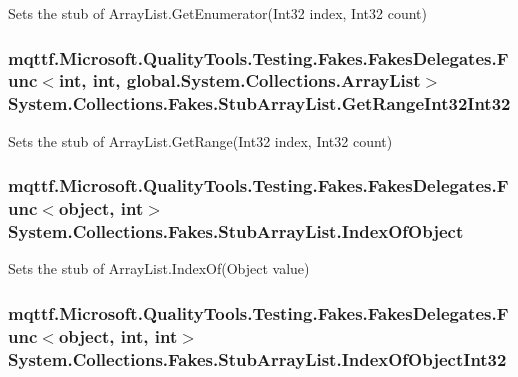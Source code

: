 Sets the stub of Array\-List.\-Get\-Enumerator(\-Int32 index, Int32 count)

\hypertarget{class_system_1_1_collections_1_1_fakes_1_1_stub_array_list_ac4ced8b31a1aa51750cb83e154f4c251}{
\subsubsection[{Get\-Range\-Int32\-Int32}]{\setlength{\rightskip}{0pt plus 5cm}mqttf.\-Microsoft.\-Quality\-Tools.\-Testing.\-Fakes.\-Fakes\-Delegates.\-Func$<$int, int, global.\-System.\-Collections.\-Array\-List$>$ System.\-Collections.\-Fakes.\-Stub\-Array\-List.\-Get\-Range\-Int32\-Int32}}\label{class_system_1_1_collections_1_1_fakes_1_1_stub_array_list_ac4ced8b31a1aa51750cb83e154f4c251}


Sets the stub of Array\-List.\-Get\-Range(\-Int32 index, Int32 count)

\hypertarget{class_system_1_1_collections_1_1_fakes_1_1_stub_array_list_a5ef9b0801f77e0e0ba7886a66dfc3974}{
\subsubsection[{Index\-Of\-Object}]{\setlength{\rightskip}{0pt plus 5cm}mqttf.\-Microsoft.\-Quality\-Tools.\-Testing.\-Fakes.\-Fakes\-Delegates.\-Func$<$object, int$>$ System.\-Collections.\-Fakes.\-Stub\-Array\-List.\-Index\-Of\-Object}}\label{class_system_1_1_collections_1_1_fakes_1_1_stub_array_list_a5ef9b0801f77e0e0ba7886a66dfc3974}


Sets the stub of Array\-List.\-Index\-Of(\-Object value)

\hypertarget{class_system_1_1_collections_1_1_fakes_1_1_stub_array_list_aff4e3edbc43a2e425eef9251effa1fe3}{
\subsubsection[{Index\-Of\-Object\-Int32}]{\setlength{\rightskip}{0pt plus 5cm}mqttf.\-Microsoft.\-Quality\-Tools.\-Testing.\-Fakes.\-Fakes\-Delegates.\-Func$<$object, int, int$>$ System.\-Collections.\-Fakes.\-Stub\-Array\-List.\-Index\-Of\-Object\-Int32}}\label{class_system_1_1_collections_1_1_fakes_1_1_stub_array_list_aff4e3edbc43a2e425eef9251effa1fe3}


